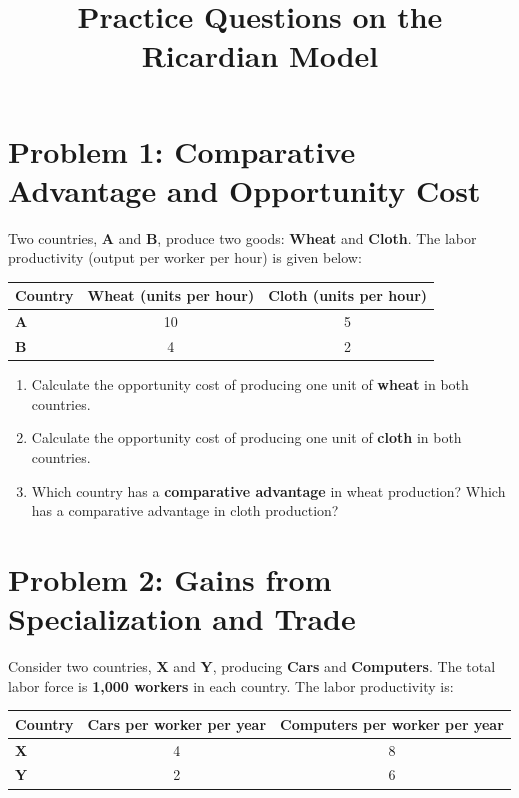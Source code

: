 \documentclass{article}
\begin{document}
\title{Practice Questions on the Ricardian Model}
\author{}
\date{}
\maketitle

\section*{Problem 1: Comparative Advantage and Opportunity Cost}
Two countries, \textbf{A} and \textbf{B}, produce two goods: \textbf{Wheat} and \textbf{Cloth}. The labor productivity (output per worker per hour) is given below:

\begin{table}[h]
    \centering
    \begin{tabular}{lcc}
        \toprule
        Country & Wheat (units per hour) & Cloth (units per hour) \\
        \midrule
        \textbf{A} & 10 & 5 \\
        \textbf{B} & 4 & 2 \\
        \bottomrule
    \end{tabular}
\end{table}

\begin{enumerate}
    \item[(a)] Calculate the opportunity cost of producing one unit of \textbf{wheat} in both countries.
    \item[(b)] Calculate the opportunity cost of producing one unit of \textbf{cloth} in both countries.
    \item[(c)] Which country has a \textbf{comparative advantage} in wheat production? Which has a comparative advantage in cloth production?
\end{enumerate}

\section*{Problem 2: Gains from Specialization and Trade}
Consider two countries, \textbf{X} and \textbf{Y}, producing \textbf{Cars} and \textbf{Computers}. The total labor force is \textbf{1,000 workers} in each country. The labor productivity is:

\begin{table}[h]
    \centering
    \begin{tabular}{lcc}
        \toprule
        Country & Cars per worker per year & Computers per worker per year \\
        \midrule
        \textbf{X} & 4 & 8 \\
        \textbf{Y} & 2 & 6 \\
        \bottomrule
    \end{tabular}
\end{table}
\end{document}
